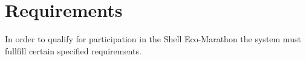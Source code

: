 \chapter{Requirements}
In order to qualify for participation in the Shell Eco-Marathon the system must fullfill certain specified requirements.

%



